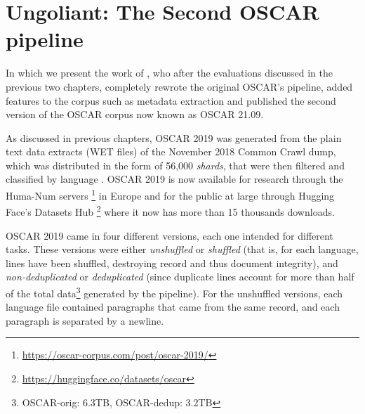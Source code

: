 \chapter{Ungoliant: The Second OSCAR pipeline}

\begin{center}
    \begin{minipage}{0.66\textwidth}
        \begin{small}
            In which we present the work of \citet{abadji-etal-2021-ungoliant}, who after the evaluations discussed in the previous two chapters, completely rewrote the original OSCAR's \goclassy pipeline, added features to the corpus such as metadata extraction and published the second version of the OSCAR corpus now known as OSCAR 21.09.\footnotemark
        \end{small}
    \end{minipage}
    \vspace{0.5cm}
\end{center}


As discussed in previous chapters, OSCAR 2019 was generated from the plain text data extracts (WET files) of the November 2018 Common Crawl dump, which was distributed in the form of 56,000 \emph{shards}, that were then filtered and classified by language \citep{ortiz-suarez-etal-2019-asynchronous,ortiz-suarez-etal-2020-monolingual}. OSCAR 2019 is now available for research through the Huma-Num servers \footnote{\url{https://oscar-corpus.com/post/oscar-2019/}} in Europe and for the public at large through Hugging Face's Datasets Hub \footnote{\url{https://huggingface.co/datasets/oscar}} where it now has more than 15 thousands downloads.

OSCAR 2019 came in four different versions, each one intended for different tasks. These versions were either \emph{unshuffled} or \emph{shuffled} (that is, for each language, lines have been shuffled, destroying record and thus document integrity), and \emph{non-deduplicated} or \emph{deduplicated} (since duplicate lines account for more than half of the total data\footnote{OSCAR-orig: 6.3TB, OSCAR-dedup: 3.2TB} generated by the pipeline). For the unshuffled versions, each language file contained paragraphs that came from the same record, and each paragraph is separated by a newline.

